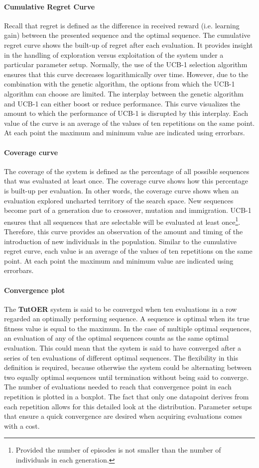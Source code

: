 \paragraph{Cumulative Regret Curve}
Recall that regret is defined as the difference in received reward (i.e.
learning gain) between the presented sequence and the optimal sequence.
The cumulative regret curve shows the built-up of regret after each
evaluation. It provides insight in the handling of exploration versus
exploitation of the system under a particular parameter setup.
Normally, the use of the UCB-1 selection algorithm ensures that
this curve decreases logarithmically over time. However, due to the
combination with the genetic algorithm, the options from which the UCB-1
algorithm can choose are limited. The interplay between the genetic algorithm
and UCB-1 can either boost or reduce performance. This curve visualizes
the amount to which the performance of UCB-1 is disrupted by this interplay.
Each value of the curve is an average of the values of ten repetitions
on the same point. At each point the maximum and minimum value are indicated
using errorbars.
\paragraph{Coverage curve}
The coverage of the system is defined as the percentage of all possible
sequences that was evaluated at least once. The coverage curve shows how this
percentage is built-up per evaluation. In other words, the coverage curve shows
when an evaluation explored uncharted territory of the search space. New
sequences become part of a generation due to crossover, mutation and
immigration. UCB-1 ensures that all sequences that are selectable will be
evaluated at least once\footnote{Provided the number of
episodes is not smaller than the number of individuals in each generation.}.
Therefore, this curve provides an observation of the amount and timing of the
introduction of new individuals in the population. Similar to the cumulative
regret curve, each value is an average of the values of ten repetitions on the
same point. At each point the maximum and minimum value are indicated using
errorbars.
\paragraph{Convergence plot}
The \textbf{TutOER} system is said to be converged when ten evaluations in a row
regarded an optimally performing sequence. A sequence is optimal when its true
fitness value is equal to the maximum. In the case of multiple optimal
sequences, an evaluation of any of the optimal sequences counts as the same
optimal evaluation. This could mean that the system is said to have converged
after a series of ten evaluations of different optimal sequences. The
flexibility in this definition is required, because otherwise the system could
be alternating between two equally optimal sequences until termination without
being said to converge. The number of evaluations needed to reach that
convergence point in each repetition is plotted in a boxplot. The fact that
only one datapoint derives from each repetition allows for this detailed look
at the distribution. Parameter setups that ensure a quick convergence are
desired when acquiring evaluations comes with a cost.
